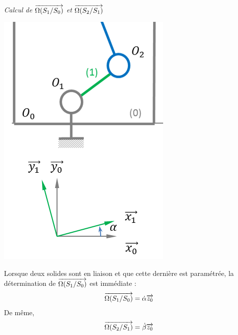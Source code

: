 \documentclass[11pt,oneside]{article}
\begin{document}
\begin{exemple}

\textit{Calcul de $\overrightarrow{\Omega(S_1/S_0)}$ et $\overrightarrow{\Omega(S_2/S_1)}$}

\begin{minipage}[c]{.3\linewidth}
\begin{center}
\includegraphics[width=.8\textwidth]{png/omega}
\end{center}
\end{minipage}
\hfill
\begin{minipage}[c]{.6\linewidth}
Lorsque deux solides sont en liaison et que cette dernière est paramétrée, la détermination de $\overrightarrow{\Omega(S_1/S_0)}$ est immédiate : 
$$
\overrightarrow{\Omega(S_1/S_0)}=\dot{\alpha}\overrightarrow{z_0}
$$
De même, 
$$
\overrightarrow{\Omega(S_2/S_1)}=\dot{\beta}\overrightarrow{z_0}
$$
\end{minipage}
\end{exemple}
\end{document}
